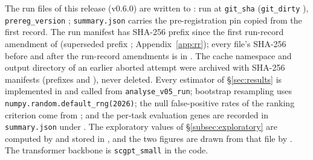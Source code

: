 \documentclass[10pt,a4paper]{article}
\begin{document}
\begin{sloppypar}
The run files of this release (v0.6.0) are written to : run
\texttt{\resRunId} at \texttt{git\_sha} \resGitSha{} (\texttt{git\_dirty}
\resGitDirty), \texttt{prereg\_version} \resPreregVersion; \texttt{summary.json} carries the
pre-registration pin copied from the first record. The run manifest
\texttt{\resRunId} has SHA-256 prefix \resManifestSha{}
since the first run-record amendment of \resRROneDate{} (superseded prefix
\resManifestShaSuperseded; Appendix~\ref{app:rr}); every file's SHA-256 before and after the
run-record amendments is in . The
cache namespace and output directory of an earlier aborted attempt were archived
with SHA-256 manifests (prefixes \resArchiveShaCache{} and
\resArchiveShaOutputs), never deleted. Every estimator of \S\ref{sec:results} is
implemented in  and called from
\texttt{analyse\_v05\_run}; bootstrap resampling uses
\texttt{numpy.random.default\_rng(2026)}; the null false-positive rates of the ranking
criterion come from ; and the per-task
evaluation genes are recorded in \texttt{summary.json} under
. The exploratory values of \S\ref{subsec:exploratory} are computed
by  and stored in
, and the two figures are drawn from that file by
. The transformer backbone is \texttt{scgpt\_small} in the
code.


\end{sloppypar}
\end{document}

